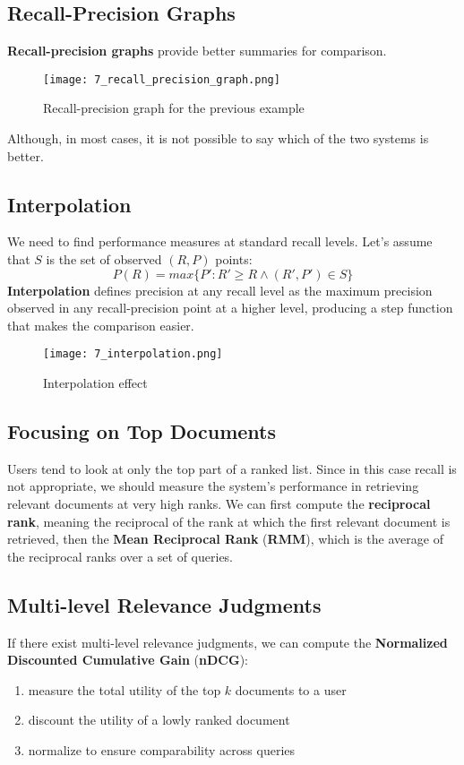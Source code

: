 \documentclass{article}
\begin{document}
\subsection{Recall-Precision Graphs}
\textbf{Recall-precision graphs} provide better summaries for comparison.
\begin{figure}[H]
    \centering
    \texttt{[image: 7\_recall\_precision\_graph.png]}
    \caption{Recall-precision graph for the previous example}
\end{figure}
Although, in most cases, it is not possible to say which of the two systems is better.

\subsection{Interpolation}
We need to find performance measures at standard recall levels. Let's assume that $S$ is the set of observed $(R,P)$ points:
\[
    P(R) = max\{P' : R' \geq R \wedge (R', P') \in S\}
\]
\textbf{Interpolation} defines precision at any recall level as the maximum precision observed in any recall-precision point at a higher level, producing a step function that makes the comparison easier.
\begin{figure}
    \centering
    \texttt{[image: 7\_interpolation.png]}
    \caption{Interpolation effect}
\end{figure}

\subsection{Focusing on Top Documents}
Users tend to look at only the top part of a ranked list. Since in this case recall is not appropriate, we should measure the system's performance in retrieving relevant documents at very high ranks. We can first compute the \textbf{reciprocal rank}, meaning the reciprocal of the rank at which the first relevant document is retrieved, then the \textbf{Mean Reciprocal Rank} (\textbf{RMM}), which is the average of the reciprocal ranks over a set of queries.

\subsection{Multi-level Relevance Judgments}
If there exist multi-level relevance judgments, we can compute the \textbf{Normalized Discounted Cumulative Gain} (\textbf{nDCG}):
\begin{enumerate}
    \item measure the total utility of the top $k$ documents to a user
    \item discount the utility of a lowly ranked document
    \item normalize to ensure comparability across queries
\end{enumerate}
\end{document}
